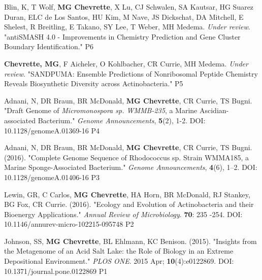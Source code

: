 \begin{cvpubs}
  \cvpub
    {Blin, K, T Wolf, \textbf{MG Chevrette}, X Lu, CJ Schwalen, SA Kautsar, HG Suarez Duran, ELC de Los Santos, HU Kim, M Nave, JS Dickschat, DA Mitchell, E Shelest, R Breitling, E Takano, SY Lee, T Weber, MH Medema.  \textit{Under review}. "antiSMASH 4.0 - Improvements in Chemistry Prediction and Gene Cluster Boundary Identification."} %
    {P6} %

  \cvpub
    {\textbf{Chevrette, MG}, F Aicheler, O Kohlbacher, CR Currie, MH Medema. \textit{Under review}. "SANDPUMA: Ensemble Predictions of Nonribosomal Peptide Chemistry Reveals Biosynthetic Diversity across Actinobacteria."} %
    {P5} %

  \cvpub
    {Adnani, N, DR Braun, BR McDonald, \textbf{MG Chevrette}, CR Currie, TS Bugni. "Draft Genome of \textit{Micromonospora sp. WMMB-235}, a Marine Ascidian-associated Bacterium." \textit{Genome Announcements}, \textbf{5}(2), 1-2. DOI: 10.1128/genomeA.01369-16} %
    {P4} %

  \cvpub
  {Adnani, N, DR Braun, BR McDonald, \textbf{MG Chevrette}, CR Currie, TS Bugni. (2016). "Complete Genome Sequence of Rhodococcus sp. Strain WMMA185, a Marine Sponge-Associated Bacterium." \textit{Genome Announcements}, \textbf{4}(6), 1–2. DOI: 10.1128/genomeA.01406-16} %
    {P3} %

  \cvpub
    {Lewin, GR, C Carlos, \textbf{MG Chevrette}, HA Horn, BR McDonald, RJ Stankey, BG Fox, CR Currie. (2016). "Ecology and Evolution of Actinobacteria and their Bioenergy Applications." \textit{Annual Review of Microbiology}. \textbf{70}: 235 -254. DOI: 10.1146/annurev-micro-102215-095748} %
    {P2} %

  \cvpub
    {Johnson, SS, \textbf{MG Chevrette}, BL Ehlmann, KC Benison. (2015). "Insights from the Metagenome of an Acid Salt Lake: the Role of Biology in an Extreme Depositional Environment."  \textit{PLOS ONE}. 2015 Apr; \textbf{10}(4):e0122869. DOI: 10.1371/journal.pone.0122869} %
    {P1} %

\end{cvpubs}

